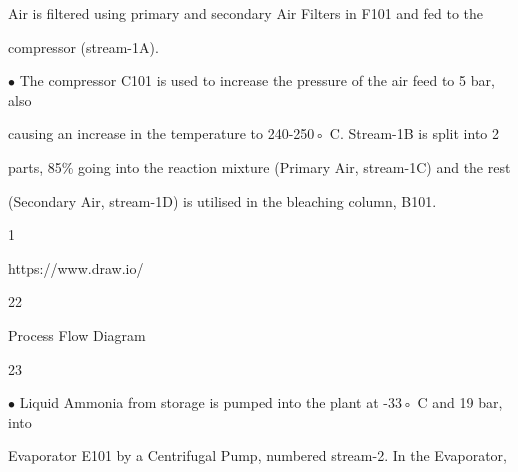 \documentclass[a4paper,portrait,12pt]{article}
\begin{document}
\begin{flushleft}
Air is filtered using primary and secondary Air Filters in F101 and fed to the
\end{flushleft}


\begin{flushleft}
compressor (stream-1A).
\end{flushleft}


\begin{flushleft}
$\bullet$ The compressor C101 is used to increase the pressure of the air feed to 5 bar, also
\end{flushleft}


\begin{flushleft}
causing an increase in the temperature to 240-250◦ C. Stream-1B is split into 2
\end{flushleft}


\begin{flushleft}
parts, 85\% going into the reaction mixture (Primary Air, stream-1C) and the rest
\end{flushleft}


\begin{flushleft}
(Secondary Air, stream-1D) is utilised in the bleaching column, B101.
\end{flushleft}


1





\begin{flushleft}
https://www.draw.io/
\end{flushleft}





22





\begin{flushleft}
\newpage
Process Flow Diagram
\end{flushleft}





23





\begin{flushleft}
$\bullet$ Liquid Ammonia from storage is pumped into the plant at -33◦ C and 19 bar, into
\end{flushleft}


\begin{flushleft}
Evaporator E101 by a Centrifugal Pump, numbered stream-2. In the Evaporator,
\end{flushleft}
\end{document}

